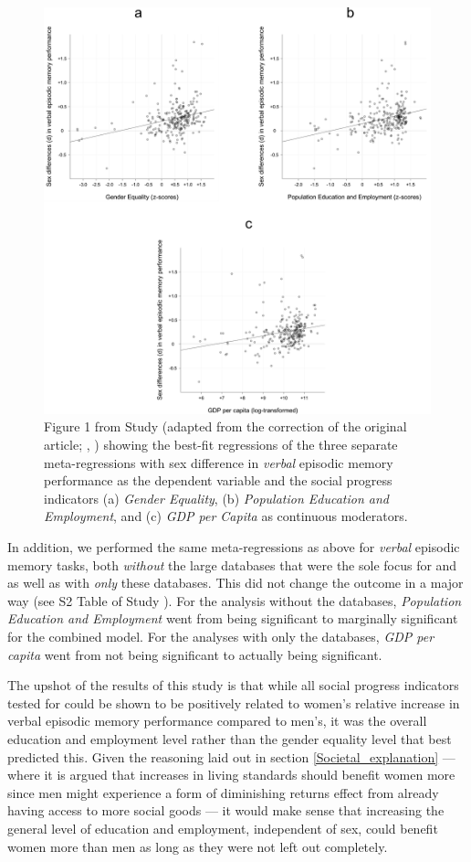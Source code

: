 \begin{figure} \centering \includegraphics[width=120mm]{./Figures/Study3_Figure2.pdf} \caption{Figure 1 from Study  (adapted from the correction of the original article; \citeauthor{Asperholm2019c}, \citeyear{Asperholm2019c}) showing the best-fit regressions of the three separate meta-regressions with sex difference in \emph{verbal} episodic memory performance as the dependent variable and the social progress indicators (a) \emph{Gender Equality}, (b) \emph{Population Education and Employment}, and (c) \emph{GDP per Capita} as continuous moderators.} \label{Figure:Study3_Figure2} \end{figure}

In addition, we performed the same meta-regressions as above for \emph{verbal} episodic memory tasks, both \emph{without} the large databases that were the sole focus for \textcite{Weber2014} and \textcite{Bonsang2017} as well as with \emph{only} these databases. This did not change the outcome in a major way (see S2 Table of Study ). For the analysis without the databases, \emph{Population Education and Employment} went from being significant to marginally significant for the combined model. For the analyses with only the databases, \emph{GDP per capita} went from not being significant to actually being significant.

The upshot of the results of this study is that while all social progress indicators tested for could be shown to be positively related to women's relative increase in verbal episodic memory performance compared to men's, it was the overall education and employment level rather than the gender equality level that best predicted this. Given the reasoning laid out in section \ref{Societal_explanation} --- where it is argued that increases in living standards should benefit women more since men might experience a form of diminishing returns effect from already having access to more social goods --- it would make sense that increasing the general level of education and employment, independent of sex, could benefit women more than men as long as they were not left out completely.

